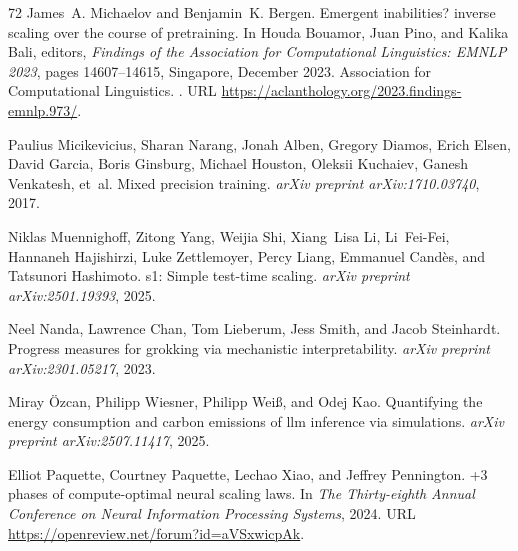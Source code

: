 \begin{thebibliography}{72}
James~A. Michaelov and Benjamin~K. Bergen.
\newblock Emergent inabilities? inverse scaling over the course of pretraining.
\newblock In Houda Bouamor, Juan Pino, and Kalika Bali, editors, \emph{Findings of the Association for Computational Linguistics: EMNLP 2023}, pages 14607--14615, Singapore, December 2023. Association for Computational Linguistics.
\newblock {}.
\newblock URL \url{https://aclanthology.org/2023.findings-emnlp.973/}.

Paulius Micikevicius, Sharan Narang, Jonah Alben, Gregory Diamos, Erich Elsen, David Garcia, Boris Ginsburg, Michael Houston, Oleksii Kuchaiev, Ganesh Venkatesh, et~al.
\newblock Mixed precision training.
\newblock \emph{arXiv preprint arXiv:1710.03740}, 2017.

Niklas Muennighoff, Zitong Yang, Weijia Shi, Xiang~Lisa Li, Li~Fei-Fei, Hannaneh Hajishirzi, Luke Zettlemoyer, Percy Liang, Emmanuel Cand{\`e}s, and Tatsunori Hashimoto.
\newblock s1: Simple test-time scaling.
\newblock \emph{arXiv preprint arXiv:2501.19393}, 2025.

Neel Nanda, Lawrence Chan, Tom Lieberum, Jess Smith, and Jacob Steinhardt.
\newblock Progress measures for grokking via mechanistic interpretability.
\newblock \emph{arXiv preprint arXiv:2301.05217}, 2023.

Miray {\"O}zcan, Philipp Wiesner, Philipp Wei{\ss}, and Odej Kao.
\newblock Quantifying the energy consumption and carbon emissions of llm inference via simulations.
\newblock \emph{arXiv preprint arXiv:2507.11417}, 2025.

Elliot Paquette, Courtney Paquette, Lechao Xiao, and Jeffrey Pennington.
+3 phases of compute-optimal neural scaling laws.
\newblock In \emph{The Thirty-eighth Annual Conference on Neural Information Processing Systems}, 2024.
\newblock URL \url{https://openreview.net/forum?id=aVSxwicpAk}.


\end{thebibliography}
